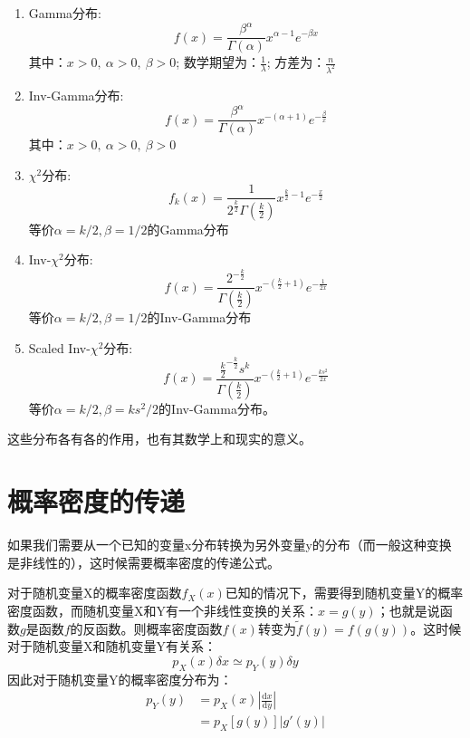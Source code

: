 \begin{enumerate}
\item Gamma分布: 
\begin{equation}
   f(x)=\frac{\beta^{\alpha}}{\Gamma(\alpha)} x^{\alpha-1} e^{-\beta x}
\end{equation}
其中：$x>0,\ \alpha>0,\ \beta>0$; 数学期望为：$\frac{1}{\lambda}$; 方差为：$\frac{n}{\lambda ^2}$

\item Inv-Gamma分布: 
\begin{equation}
    f(x)=\frac{\beta^{\alpha}}{\Gamma(\alpha)} x^{-(\alpha+1)} e^{-\frac{\beta}{x}}
\end{equation}
其中：$x>0,\ \alpha>0,\ \beta>0$

\item $\chi ^2$分布: 
\begin{equation}
    f_{k}(x)=\frac{1}{2^{\frac{k}{2}} \Gamma\left(\frac{k}{2}\right)} x^{\frac{k}{2}-1} e^{-\frac{x}{2}}
\end{equation}
等价$\alpha=k/2,\beta = 1/2$的Gamma分布

\item  Inv-$\chi ^2$分布: 
\begin{equation}
    f(x)=\frac{2^{-\frac{k}{2}}}{\Gamma\left(\frac{k}{2}\right)} x^{-\left(\frac{k}{2}+1\right)} e^{-\frac{1}{2 x}}
\end{equation}
等价$\alpha=k/2,\beta = 1/2$的Inv-Gamma分布

\item  Scaled Inv-$\chi ^2$分布: 
   \begin{equation}
       f(x)=\frac{\frac{k}{2}^{-\frac{k}{2}} s^{k}}{\Gamma\left(\frac{k}{2}\right)} x^{-\left(\frac{k}{2}+1\right)} e^{-\frac{k s^{2}}{2 x}}
   \end{equation}
     等价$\alpha=k/2,\beta = ks^2/2$的Inv-Gamma分布。
\end{enumerate}
这些分布各有各的作用，也有其数学上和现实的意义。
\section{概率密度的传递}
如果我们需要从一个已知的变量x分布转换为另外变量y的分布（而一般这种变换是非线性的），这时候需要概率密度的传递公式。

对于随机变量X的概率密度函数$f_X(x)$已知的情况下，需要得到随机变量Y的概率密度函数，而随机变量X和Y有一个非线性变换的关系：$x=g(y)$；也就是说函数$g$是函数$f$的反函数。则概率密度函数$f(x)$转变为$\widetilde{f}(y)=f(g(y))$。这时候对于随机变量X和随机变量Y有关系：
\begin{equation}
    p_X(x)\delta x \simeq p_Y(y)\delta y
\end{equation}
因此对于随机变量Y的概率密度分布为：
\begin{equation}
    \begin{aligned}
        p_Y(y)&=p_X(x)\left| \frac{\textrm{d}x}{\textrm{d}y} \right|\\
        &=p_X[g(y)]|g'(y)|
    \end{aligned}
\end{equation}

